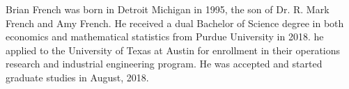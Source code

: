 \documentclass[12pt]{report}	%
\theoremstyle{definition}
\theoremstyle{remark}
\begin{document}
	
	
	
	
	\begin{vita}
		Brian French
		was born in Detroit Michigan in 1995, the son of Dr. R. Mark French and Amy French.  He received a dual Bachelor of Science degree in both economics and mathematical statistics from Purdue University in 2018. he applied to the University of Texas at Austin for enrollment in their operations research and industrial engineering program. He was accepted and started graduate studies in August, 2018.
		
	\end{vita}
	
\end{document}
